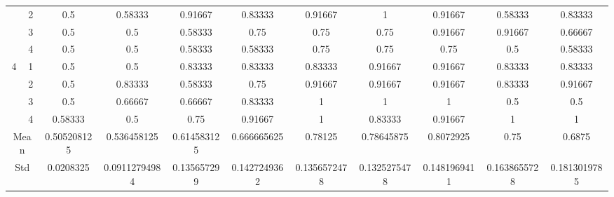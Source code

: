 \documentclass[draft,dvipsnames]{drexel-thesis}
\begin{document}
\begin{thesis}
\begin{table}[!t]
{\begin{tabular}{|c|c|c|c|c|c|c|c|c|c|c|}
                      & 2                   & 0.5         & 0.58333       & 0.91667     & 0.83333      & 0.91667      & 1            & 0.91667      & 0.58333      & 0.83333      \\ \cline{2-11}
                      & 3                   & 0.5         & 0.5           & 0.58333     & 0.75         & 0.75         & 0.75         & 0.91667      & 0.91667      & 0.66667      \\ \cline{2-11}
                      & 4                   & 0.5         & 0.5           & 0.58333     & 0.58333      & 0.75         & 0.75         & 0.75         & 0.5          & 0.58333      \\ \hline
\multirow{4}{*}{4}    & 1                   & 0.5         & 0.5           & 0.83333     & 0.83333      & 0.83333      & 0.91667      & 0.91667      & 0.83333      & 0.83333      \\ \cline{2-11}
                      & 2                   & 0.5         & 0.83333       & 0.58333     & 0.75         & 0.91667      & 0.91667      & 0.91667      & 0.83333      & 0.91667      \\ \cline{2-11}
                      & 3                   & 0.5         & 0.66667       & 0.66667     & 0.83333      & 1            & 1            & 1            & 0.5          & 0.5          \\ \cline{2-11}
                      & 4                   & 0.58333     & 0.5           & 0.75        & 0.91667      & 1            & 0.83333      & 0.91667      & 1            & 1            \\ \hline
\multicolumn{2}{|c|}{Mean}                  & 0.505208125 & 0.536458125   & 0.614583125 & 0.666665625  & 0.78125      & 0.78645875   & 0.8072925    & 0.75         & 0.6875       \\ \hline
\multicolumn{2}{|c|}{Std}                   & 0.0208325   & 0.09112794984 & 0.135657299 & 0.1427249362 & 0.1356572478 & 0.1325275478 & 0.1481969411 & 0.1638655728 & 0.1813019785 \\ \hline
\end{tabular}}
\end{table}



\end{thesis}
\end{document}
